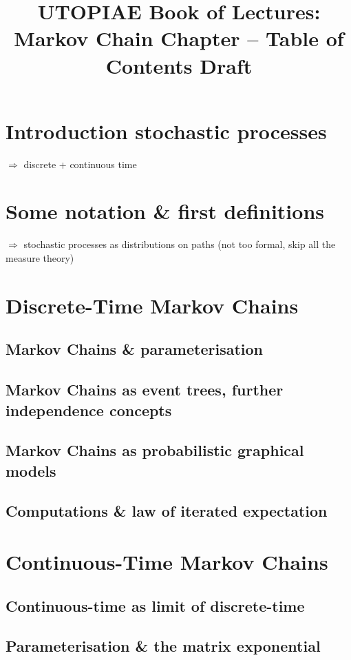 \documentclass[11pt]{article}
\title{UTOPIAE Book of Lectures:\\Markov Chain Chapter -- Table of Contents Draft}
\date{}
\author{}
\begin{document}
\maketitle

\vspace{-55pt}

\section{Introduction stochastic processes}
$\Rightarrow$ discrete + continuous time
\vspace{-12pt}
\section{Some notation \& first definitions}
$\Rightarrow$ stochastic processes as distributions on paths (not too formal, skip all the measure theory)
\vspace{-12pt}
\section{Discrete-Time Markov Chains}

\subsection{Markov Chains \& parameterisation}
\subsection{Markov Chains as event trees, further independence concepts}
\subsection{Markov Chains as probabilistic graphical models}
\subsection{Computations \& law of iterated expectation}

\section{Continuous-Time Markov Chains}
\subsection{Continuous-time as limit of discrete-time}
\subsection{Parameterisation \& the matrix exponential}
\end{document}
